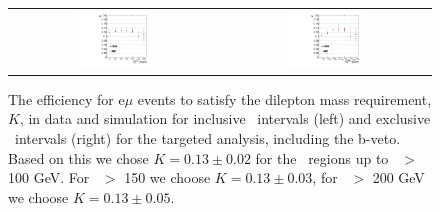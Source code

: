 \begin{figure}[!hb]
\begin{center}
\begin{tabular}{cc}
\includegraphics[width=0.4\textwidth]{plots/extractK_inclusive_bveto_19p5fb.pdf} &
\includegraphics[width=0.4\textwidth]{plots/extractK_exclusive_bveto_19p5fb.pdf} \\
\end{tabular}
\caption{
The efficiency for e$\mu$ events to satisfy the dilepton mass requirement, $K$, in data and simulation for inclusive \MET\ intervals (left) and
exclusive \MET\ intervals (right) for the targeted analysis, including the b-veto. 
Based on this we chose $K=0.13\pm0.02$ for the \MET\ regions up to \MET\ $>$ 100 GeV.
For \MET\ $>$ 150 we choose $K=0.13\pm0.03$, for \MET\ $>$ 200 GeV we choose $K=0.13\pm0.05$.
\label{fig:K_targeted}
}

\end{center}
\end{figure}
